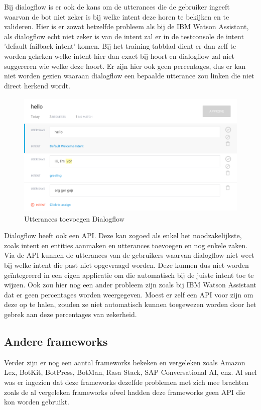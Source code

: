 Bij dialogflow is er ook de kans om de utterances die de gebruiker ingeeft waarvan de bot niet zeker is bij welke intent deze horen te bekijken en te valideren. Hier is er zowat hetzelfde probleem als bij de IBM Watson Assistant, als dialogflow echt niet zeker is van de intent zal er in de testconsole de intent 'default failback intent' komen. Bij het training tabblad dient er dan zelf te worden gekeken welke intent hier dan exact bij hoort en dialogflow zal niet suggereren wie welke deze hoort. Er zijn hier ook geen percentages, dus er kan niet worden gezien waaraan dialogflow een bepaalde utterance zou linken die niet direct herkend wordt.

\begin{figure}[h!]
	\centering
	\includegraphics[height=6cm]{img/dia_training.png}
	\caption{Utterances toevoegen Dialogflow}
	\label{fig:trainingdialogflow}
\end{figure}

Dialogflow heeft ook een API. Deze kan zogoed als enkel het noodzakelijkste, zoals intent en entities aanmaken en utterances toevoegen en nog enkele zaken. Via de API kunnen de utterances van de gebruikers waarvan dialogflow niet weet bij welke intent die past niet opgevraagd worden. Deze kunnen dus niet worden geïntegreerd in een eigen applicatie om die automatisch bij de juiste intent toe te wijzen. Ook zou hier nog een ander probleem zijn zoals bij IBM Watson Assistant dat er geen percentages worden weergegeven. Moest er zelf een API voor zijn om deze op te halen, zouden ze niet automatisch kunnen toegewezen worden door het gebrek aan deze percentages van zekerheid.

\subsection{Andere frameworks}
\label{andereFrameworks}

Verder zijn er nog een aantal frameworks bekeken en vergeleken zoals Amazon Lex, BotKit, BotPress, BotMan, Rasa Stack, SAP Conversational AI, enz. Al snel was er ingezien dat deze frameworks dezelfde problemen met zich mee brachten zoals de al vergeleken frameworks ofwel hadden deze frameworks geen API die kon worden gebruikt. 

